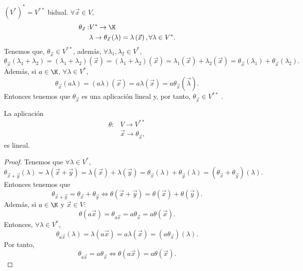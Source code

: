 \begin{observation}
\normalfont $\displaystyle \left(V^{*}\right)^{*} = V^{**} $ bidual. $\displaystyle \forall \vec{x} \in V $, 
\[
\begin{split}
	\theta_{\vec{x}}: & V^{*} \to \K\\
& \lambda \to \theta_{\vec{x}}\left(\lambda \right) = \lambda\left(\vec{x}\right), \forall \lambda \in V^{*}.
\end{split}
\]
Tenemos que, $\displaystyle \theta_{\vec{x}} \in V^{**} $, además, $\displaystyle \forall\lambda_{1}, \lambda_{2} \in V^{*} $,
\[\theta_{\vec{x}} \left(\lambda_{1}+\lambda_{2}\right)= \left(\lambda_{1}+\lambda_{2}\right)\left(\vec{x}\right) = \left(\lambda_{1}+\lambda_{2}\right)\left(\vec{x}\right) = \lambda_{1}\left(\vec{x}\right) + \lambda_{2}\left(\vec{x}\right) = \theta_{\vec{x}}\left(\lambda_{1}\right) + \theta_{\vec{x}}\left(\lambda_{2}\right) .\]
Además, si $\displaystyle a \in \K $, $\displaystyle \forall\lambda \in V^{*} $, 
\[\theta_{\vec{x}}\left(a\lambda\right) = \left(a\lambda\right)\left(\vec{x}\right) = a \lambda\left(\vec{x}\right) = a \theta_{\vec{x}}\left(\vec{\lambda}\right) .\]
Entonces tenemos que $\displaystyle \theta_{\vec{x}} $ es una aplicación lineal y, por tanto, $\displaystyle \theta_{\vec{x}} \in V^{**} $ .
\end{observation}

\begin{ftheorem}[]
\normalfont La aplicación
\[
\begin{split}
	\theta : & V \to V^{**} \\
		 & \vec{x} \to \theta_{\vec{x}},
\end{split}
\]
es lineal.
\end{ftheorem}

\begin{proof}
Tenemos que $\displaystyle \forall \lambda \in V^{*} $,
\[\theta_{\vec{x}+\vec{y}}\left(\lambda \right) = \lambda\left(\vec{x}+\vec{y}\right) = \lambda\left(\vec{x}\right) + \lambda\left(\vec{y}\right) = \theta_{\vec{x}}\left(\lambda \right) + \theta_{\vec{y}}\left(\lambda \right) = \left(\theta_{\vec{x}}+\theta_{\vec{y}}\right)\left(\lambda\right) .\]
Entonces tenemos que 
\[\theta_{\vec{x}+\vec{y}} = \theta_{\vec{x}} + \theta_{\vec{y}} \iff \theta\left(\vec{x}+\vec{y}\right) = \theta\left(\vec{x}\right) + \theta\left(\vec{y}\right) .\]
Además, si $\displaystyle a \in \K $ y $\displaystyle \vec{x} \in V $:
\[\theta\left(a\vec{x}\right) = \theta_{a\vec{x}} = a \theta_{\vec{x}} = a\theta\left(\vec{x}\right) .\]
Entonces, $\displaystyle \forall \lambda \in V^{*} $,
\[\theta_{a\vec{x}}\left(\lambda\right) = \lambda\left(a\vec{x}\right) = a\lambda\left(\vec{x}\right) = \left(a\theta_{\vec{x}}\right)\left(\lambda\right) .\]
Por tanto,
\[\theta_{a\vec{x}} = a\theta_{\vec{x}} \iff \theta\left(a\vec{x}\right) = a \theta\left(\vec{x}\right) .\]
\end{proof}

